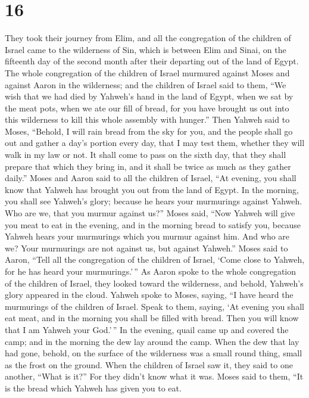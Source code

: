 \hypertarget{section-15}{%
\section{16}\label{section-15}}

 They took their journey from Elim, and all the
congregation of the children of Israel came to the wilderness of Sin,
which is between Elim and Sinai, on the fifteenth day of the second
month after their departing out of the land of Egypt.  The
whole congregation of the children of Israel murmured against Moses and
against Aaron in the wilderness;  and the children of
Israel said to them, ``We wish that we had died by Yahweh's hand in the
land of Egypt, when we sat by the meat pots, when we ate our fill of
bread, for you have brought us out into this wilderness to kill this
whole assembly with hunger.''  Then Yahweh said to Moses,
``Behold, I will rain bread from the sky for you, and the people shall
go out and gather a day's portion every day, that I may test them,
whether they will walk in my law or not.  It shall come to
pass on the sixth day, that they shall prepare that which they bring in,
and it shall be twice as much as they gather daily.'' 
Moses and Aaron said to all the children of Israel, ``At evening, you
shall know that Yahweh has brought you out from the land of Egypt.
 In the morning, you shall see Yahweh's glory; because he
hears your murmurings against Yahweh. Who are we, that you murmur
against us?''  Moses said, ``Now Yahweh will give you meat
to eat in the evening, and in the morning bread to satisfy you, because
Yahweh hears your murmurings which you murmur against him. And who are
we? Your murmurings are not against us, but against Yahweh.''
 Moses said to Aaron, ``Tell all the congregation of the
children of Israel, `Come close to Yahweh, for he has heard your
murmurings.'\,''  As Aaron spoke to the whole
congregation of the children of Israel, they looked toward the
wilderness, and behold, Yahweh's glory appeared in the cloud.
 Yahweh spoke to Moses, saying,  ``I have
heard the murmurings of the children of Israel. Speak to them, saying,
`At evening you shall eat meat, and in the morning you shall be filled
with bread. Then you will know that I am Yahweh your God.'\,''
 In the evening, quail came up and covered the camp; and
in the morning the dew lay around the camp.  When the dew
that lay had gone, behold, on the surface of the wilderness was a small
round thing, small as the frost on the ground.  When the
children of Israel saw it, they said to one another, ``What is it?'' For
they didn't know what it was. Moses said to them, ``It is the bread
which Yahweh has given you to eat.

